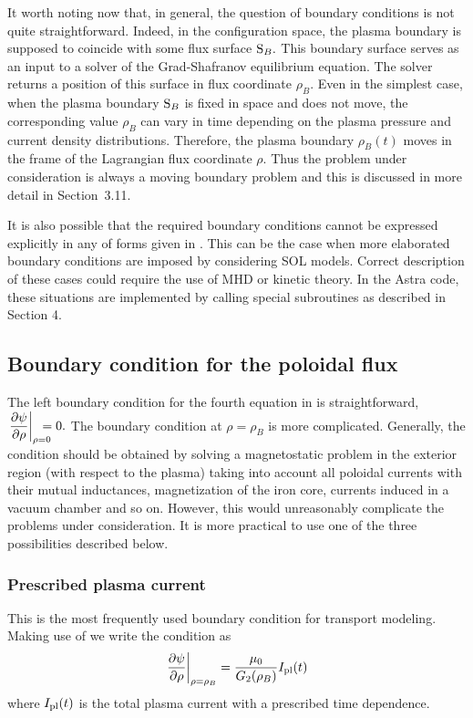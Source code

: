 It worth noting now that, in general, the question of boundary
conditions is not quite straightforward. 
Indeed, in the configuration space, the plasma boundary is supposed to
coincide with some flux surface $\mbox{\cal S}_B.$ 
This boundary surface serves as an input to a solver of the
Grad-Shafranov equilibrium equation. 
The solver returns a position of this surface in flux coordinate $\rho_B.$
Even in the simplest case, when the plasma boundary
$\mbox{\cal S}_B$ is fixed in space and does not move, the
corresponding value $\rho_B$ can vary in time depending on the plasma
pressure and current density distributions. 
Therefore, the plasma boundary $\rho_B(t)$ moves in the frame of the
Lagrangian flux coordinate $\rho.$ 
Thus the problem under consideration is always a moving boundary
problem and this is discussed in more detail in Section~3.11.

It is also possible that the required boundary conditions cannot be
expressed explicitly in any of forms given in . 
This can be the case when more elaborated boundary conditions are
imposed by considering SOL models.
Correct description of these cases could require the use of MHD or
kinetic theory. 
In the Astra code, these situations are implemented by calling special
subroutines as described in Section 4. 

\subsection{Boundary condition for the poloidal flux}

The left boundary condition for the fourth equation in  is
straightforward, 
${\lb.\prti{\psi}{\rho}\rb|_{\rho=0}\hspace*{-10pt}=0}.$
The boundary condition at $\rho=\rho_B$ is more complicated. 
Generally, the condition should be obtained by solving a magnetostatic
problem in the exterior region (with respect to the plasma) taking into
account all poloidal currents with their mutual inductances,
magnetization of the iron core, currents induced in a vacuum chamber and
so on. 
However, this would unreasonably complicate the problems under
consideration. 
It is more practical to use one of the three possibilities described
below. 

\subsubsection{Prescribed plasma current} 
This is the most frequently used boundary condition for transport
modeling. 
Making use of  we write the condition as
\begin{equation}\label{bcI}
\left.\displaystyle{\partial \psi\over\partial \rho}\right|_{\rho=\rho_B}
=\frac{\mu_0}{G_2(\rho_B)}I_{\rm pl}(t)
\end{equation}
where $I_{\rm pl}(t)$ is the total plasma current with a prescribed time
dependence. 

